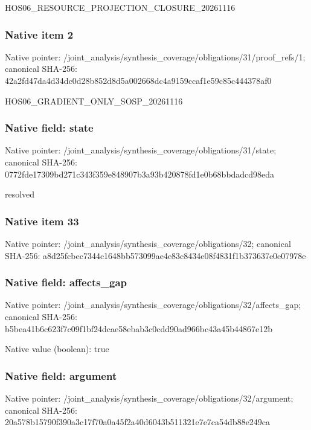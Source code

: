 \documentclass[10pt,a4paper]{article}
\begin{document}
\begingroup\raggedright\sloppy HOS06\_\allowbreak{}RESOURCE\_\allowbreak{}PROJECTION\_\allowbreak{}CLOSURE\_\allowbreak{}20261116\par\endgroup

\subsubsection{Native item 2}
Native pointer: /joint\_\allowbreak{}analysis/synthesis\_\allowbreak{}coverage/obligations/31/proof\_\allowbreak{}refs/1; canonical SHA-256: 42a2fd47da4d34dc0d28b852d8d5a002668dc4a9159ccaf1e59c85c444378af0

\begingroup\raggedright\sloppy HOS06\_\allowbreak{}GRADIENT\_\allowbreak{}ONLY\_\allowbreak{}SOSP\_\allowbreak{}20261116\par\endgroup

\subsubsection{Native field: state}
Native pointer: /joint\_\allowbreak{}analysis/synthesis\_\allowbreak{}coverage/obligations/31/state; canonical SHA-256: 0772fde17309bd271c343f359e848907b3a93b420878fd1e0b68bbdadcd98eda

\begingroup\raggedright\sloppy resolved\par\endgroup

\subsubsection{Native item 33}
Native pointer: /joint\_\allowbreak{}analysis/synthesis\_\allowbreak{}coverage/obligations/32; canonical SHA-256: a8d25fcbec7344c1648bb573099ae4e83c8434e08f4831f1b373637e0e07978e

\subsubsection{Native field: affects\_\allowbreak{}gap}
Native pointer: /joint\_\allowbreak{}analysis/synthesis\_\allowbreak{}coverage/obligations/32/affects\_\allowbreak{}gap; canonical SHA-256: b5bea41b6c623f7c09f1bf24dcae58ebab3c0cdd90ad966bc43a45b44867e12b

Native value (boolean): true

\subsubsection{Native field: argument}
Native pointer: /joint\_\allowbreak{}analysis/synthesis\_\allowbreak{}coverage/obligations/32/argument; canonical SHA-256: 20a578b15790f390a3c17f70a0a45f2a40d6043b511321e7e7ca54db88e249ca
\end{document}
